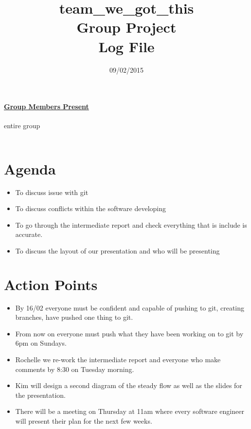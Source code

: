 \documentclass{article}
\begin{document}
	\title{team\_we\_got\_this\\ Group Project \\ Log File}
	
	\date{09/02/2015}
	
	\maketitle
	


	{\bf\underline{Group Members Present}}\\\\
		entire group\\\\

	
	\section*{Agenda}
		\begin{itemize}
			\item To discuss issue with git 
			\item To discuss conflicts within the software developing
			\item To go through the intermediate report and check everything that is include is accurate.
			\item To discuss the layout of our presentation and who will be presenting 
		\end{itemize}
	
	
	
	
	\section*{ Action Points}
	\begin{itemize}
		\item By 16/02 everyone must be confident and capable of pushing to git, creating branches, have pushed one thing to git. 
		\item From now on everyone must push what they have been working on to git by 6pm on Sundays. 
		\item Rochelle we re-work the intermediate report and everyone who make comments by 8:30 on Tuesday morning. 
		\item Kim will design a second diagram of the steady flow as well as the slides for the presentation. 
		\item There will be a meeting on Thursday at 11am where every software engineer will present their plan for the next few weeks.
	\end{itemize}
	
\end{document}
